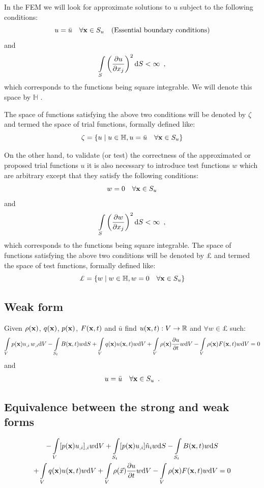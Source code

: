 In the FEM we will look for approximate solutions to $u$ subject to the following conditions:
\[u = \bar u \quad \forall \vb x \in S_u \quad \text{(Essential boundary conditions)}\] 
and
\[\int\limits_S \left(\pdv{u}{x_j}\right)^2 \dd S < \infty \enspace ,\]
which corresponds to the functions being square integrable. We will denote this space by $\mathbb{H}$ .

The space of functions satisfying the above two conditions will be denoted by $\zeta$ and termed the space of trial functions, formally defined like:
\[\zeta  = \left\{ u \mid u \in \mathbb{H},u = \bar u \quad \forall\vb x  \in S_u \right\}\]

On the other hand, to validate (or test) the correctness of the approximated or proposed trial functions $u$ it is also necessary to introduce test functions $w$ which are arbitrary except that they satisfy the following conditions:
\[w = 0\quad \forall \vb x \in S_u\] 
and
\[\int\limits_S \left(\pdv{w}{x_j}\right)^2 \dd S < \infty \enspace ,\]
which corresponds to the functions being square integrable. The space of functions satisfying the above two conditions will be denoted by $\pounds$ and termed the space of test functions, formally defined like:
\[\pounds  = \left\{w \mid w \in \mathbb{H},w = 0 \quad \forall \vb x \in S_u\right\}\]

\subsection*{Weak form}
Given $\rho(\vb x)$, $q(\vb x)$, $p(\vb x)$, $F(\vb x, t)$ and $\bar u$ find $u(\vb x , t):V \to \mathbb{R}$ and $\forall w \in \pounds$ such:
\[\int\limits_V p(\vb x) u_{,i}\, w_{,i}\dd V - \int\limits_{S_t} B(\vb x, t)w \dd S  + \int\limits_V q(\vb x)u(\vb x, t)w\dd V  + \int\limits_V \rho(\vb x)\pdv{u}{t}w \dd V - \int\limits_V \rho(\vb x) F(\vb x, t)w\dd V = 0\]
and
\[u = \bar u\quad \forall\vb x \in S_u \enspace .\]

\subsection*{Equivalence between the strong and weak forms}
\begin{multline}
    -\int\limits_V [p(\vb x)u_{,i}]_{,i}w \dd V + \int\limits_{S_t} [p(\vb x)u_{,i}] \hat n_i w\dd S - \int\limits_{S_t} B(\vb x, t)w\dd S\\
    + \int\limits_V q(\vb x)u(\vb x, t)w \dd V  + \int\limits_V \rho(\vec x)\pdv{u}{t}w\dd V - \int\limits_V \rho(\vb x)F(\vb x, t)w\dd V = 0 
\end{multline}

